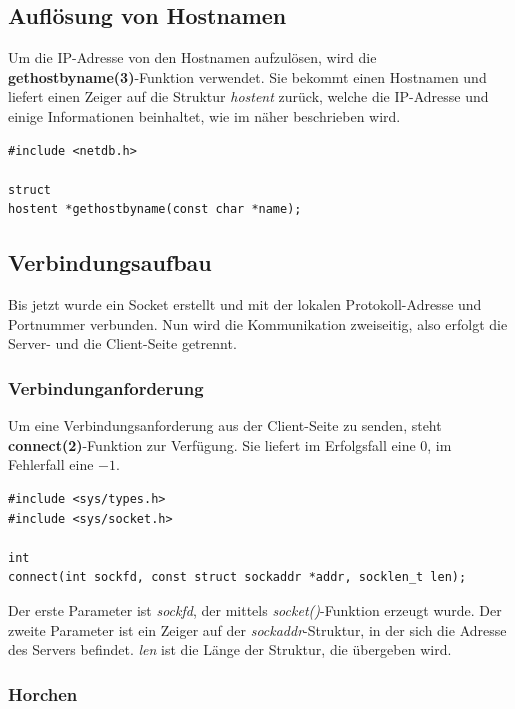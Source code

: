 \subsection{Auflösung von Hostnamen}

Um die IP-Adresse von den Hostnamen aufzulösen, wird die \textbf{gethostbyname(3)}-Funktion verwendet. Sie bekommt einen Hostnamen und liefert einen Zeiger auf die Struktur \textit{hostent} zurück, welche die IP-Adresse und einige Informationen beinhaltet, wie im  näher beschrieben wird. \smallskip \smallskip

\begin{verbatim}
#include <netdb.h>

struct 
hostent *gethostbyname(const char *name);
\end{verbatim}

\subsection{Verbindungsaufbau}

Bis jetzt wurde ein Socket erstellt und mit der lokalen Protokoll-Adresse und Portnummer verbunden. Nun wird die Kommunikation zweiseitig, also erfolgt die Server- und die Client-Seite getrennt. 

\subsubsection{Verbindunganforderung}

Um eine Verbindungsanforderung aus der Client-Seite zu senden, steht \textbf{connect(2)}-Funktion zur Verfügung. Sie liefert im Erfolgsfall eine $0$, im Fehlerfall eine $-1$. \smallskip \smallskip

\begin{verbatim}
#include <sys/types.h>
#include <sys/socket.h>

int
connect(int sockfd, const struct sockaddr *addr, socklen_t len);
\end{verbatim}
\smallskip \smallskip

Der erste Parameter ist \textit{sockfd}, der mittels \textit{socket()}-Funktion erzeugt wurde. Der zweite Parameter ist ein Zeiger auf der \textit{sockaddr}-Struktur, in der sich die Adresse des Servers befindet. \textit{len} ist die Länge der Struktur, die übergeben wird.

\subsubsection{Horchen}

